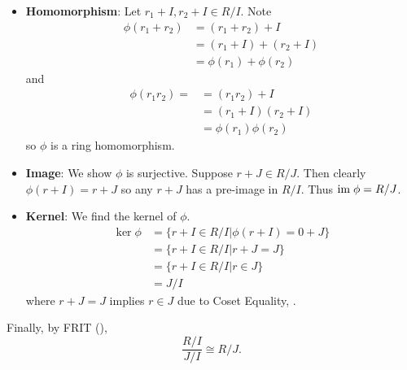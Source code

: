 \begin{questions}
\begin{partquestions}{\roman*}
\begin{itemize}
            \item \textbf{Homomorphism}: Let $r_1 + I, r_2 + I \in R/I$. Note
            \begin{align*}
                \phi(r_1+r_2) &= (r_1+r_2) + I\\
                &= (r_1+I) + (r_2+I)\\
                &= \phi(r_1) + \phi(r_2)
            \end{align*}
            and
            \begin{align*}
                \phi(r_1r_2) = &= (r_1r_2) + I\\
                &= (r_1+I)(r_2+I)\\
                &= \phi(r_1)\phi(r_2)
            \end{align*}
            so $\phi$ is a ring homomorphism.
    
            \item \textbf{Image}: We show $\phi$ is surjective. Suppose $r + J \in R/J$. Then clearly $\phi(r+I) = r+J$ so any $r+J$ has a pre-image in $R/I$. Thus $\mathrm{im}\;\phi = R/J$.
            
            \item \textbf{Kernel}: We find the kernel of $\phi$.
            \begin{align*}
                \ker\phi &= \{r+I \in R/I \vert \phi(r+I) = 0+J\}\\
                &= \{r+I \in R/I \vert r+J = J\}\\
                &= \{r+I \in R/I \vert r \in J\}\\
                &= J/I
            \end{align*}
            where $r+J=J$ implies $r \in J$ due to Coset Equality, .
        \end{itemize}
        Finally, by FRIT (),
        \[
            \frac{R/I}{J/I} \cong R/J.
        \]
    \end{partquestions}
\end{questions}
